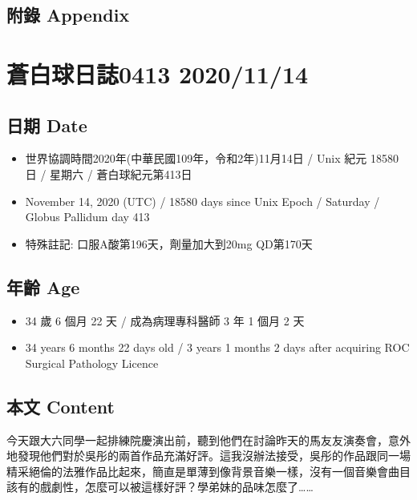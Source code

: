 \documentclass[a5paper, 11pt
]{book}
\providecommand{\tightlist}{%
  \setlength{\itemsep}{0pt}\setlength{\parskip}{0pt}}
\begin{document}
\hypertarget{ux9644ux9304-appendix-67}{%
\subsection{附錄 Appendix}\label{ux9644ux9304-appendix-67}}

\hypertarget{ux84bcux767dux7403ux65e5ux8a8c0413-20201114}{%
\section{蒼白球日誌0413
2020/11/14}\label{ux84bcux767dux7403ux65e5ux8a8c0413-20201114}}

\hypertarget{ux65e5ux671f-date-68}{%
\subsection{日期 Date}\label{ux65e5ux671f-date-68}}

\begin{itemize}
\tightlist
\item
  世界協調時間2020年(中華民國109年，令和2年)11月14日 / Unix 紀元 18580
  日 / 星期六 / 蒼白球紀元第413日
\item
  November 14, 2020 (UTC) / 18580 days since Unix Epoch / Saturday /
  Globus Pallidum day 413
\item
  特殊註記: 口服A酸第196天，劑量加大到20mg QD第170天
\end{itemize}

\hypertarget{ux5e74ux9f61-age-68}{%
\subsection{年齡 Age}\label{ux5e74ux9f61-age-68}}

\begin{itemize}
\tightlist
\item
  34 歲 6 個月 22 天 / 成為病理專科醫師 3 年 1 個月 2 天
\item
  34 years 6 months 22 days old / 3 years 1 months 2 days after
  acquiring ROC Surgical Pathology Licence
\end{itemize}

\hypertarget{ux672cux6587-content-68}{%
\subsection{本文 Content}\label{ux672cux6587-content-68}}

今天跟大六同學一起排練院慶演出前，聽到他們在討論昨天的馬友友演奏會，意外地發現他們對於吳彤的兩首作品充滿好評。這我沒辦法接受，吳彤的作品跟同一場精采絕倫的法雅作品比起來，簡直是單薄到像背景音樂一樣，沒有一個音樂會曲目該有的戲劇性，怎麼可以被這樣好評？學弟妹的品味怎麼了\ldots\ldots{}
\end{document}
